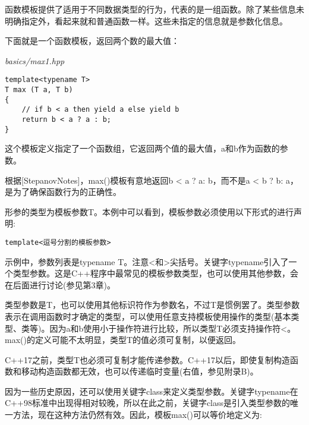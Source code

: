 

函数模板提供了适用于不同数据类型的行为，代表的是一组函数。除了某些信息未明确指定外，看起来就和普通函数一样。这些未指定的信息就是参数化信息。


下面就是一个函数模板，返回两个数的最大值：

\noindent
\textit{basics/max1.hpp}
\begin{lstlisting}[style=styleCXX]
template<typename T>
T max (T a, T b)
{
	// if b < a then yield a else yield b
	return b < a ? a : b;
}
\end{lstlisting}

这个模板定义指定了一个函数组，它返回两个值的最大值，a和b作为函数的参数。

\begin{tcolorbox}[colback=webgreen!5!white,colframe=webgreen!75!black]
\hspace*{0.75cm}根据[StepanovNotes]，max()模板有意地返回b < a ? a: b，而不是a < b ? b: a，是为了确保函数行为的正确性。
\end{tcolorbox}

形参的类型为模板参数T。本例中可以看到，模板参数必须使用以下形式的进行声明:

\begin{lstlisting}[style=styleCXX]
template<逗号分割的模板参数>
\end{lstlisting}

示例中，参数列表是typename T。注意<和>尖括号。关键字typename引入了一个类型参数。这是C++程序中最常见的模板参数类型，也可以使用其他参数，会在后面进行讨论(参见第3章)。

类型参数是T，也可以使用其他标识符作为参数名，不过T是惯例罢了。类型参数表示在调用函数时才确定的类型，可以使用任意支持模板使用操作的类型(基本类型、类等)。因为a和b使用小于操作符进行比较，所以类型T必须支持操作符<。max()的定义可能不太明显，类型T的值必须可复制，以便返回。

\begin{tcolorbox}[colback=webgreen!5!white,colframe=webgreen!75!black]
\hspace*{0.75cm}C++17之前，类型T也必须可复制才能传递参数。C++17以后，即使复制构造函数和移动构造函数都无效，也可以传递临时变量(右值，参见附录B)。
\end{tcolorbox}

因为一些历史原因，还可以使用关键字class来定义类型参数。关键字typename在C++98标准中出现得相对较晚，所以在此之前，关键字class是引入类型参数的唯一方法，现在这种方法仍然有效。因此，模板max()可以等价地定义为:


